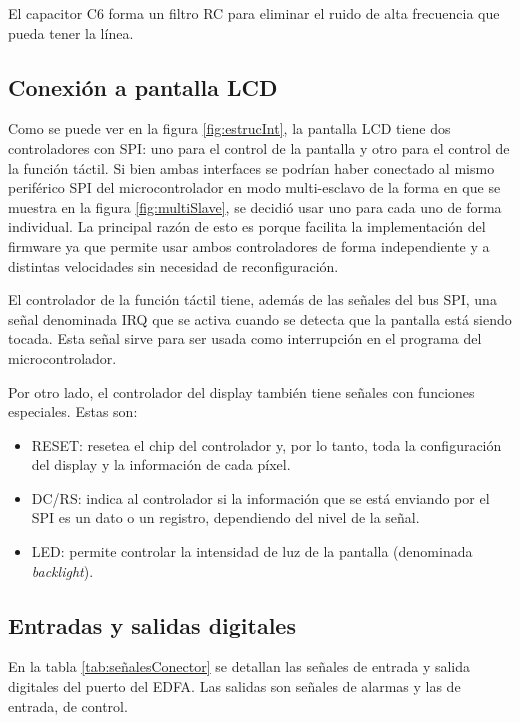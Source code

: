 El capacitor C6 forma un filtro RC \citep{WEBSITE:RC_CIRCUIT} para eliminar el ruido de alta frecuencia que pueda tener la línea.

\subsection{Conexión a pantalla LCD}
\label{sec:conLCD}

Como se puede ver en la figura \ref{fig:estrucInt}, la pantalla LCD tiene dos controladores con SPI: uno para el control de la pantalla y otro para el control de la función táctil. Si bien ambas interfaces se podrían haber conectado al mismo periférico SPI del microcontrolador en modo multi-esclavo de la forma en que se muestra en la figura \ref{fig:multiSlave}, se decidió usar uno para cada uno de forma individual. La principal razón de esto es porque facilita la implementación del firmware ya que permite usar ambos controladores de forma independiente y a distintas velocidades sin necesidad de reconfiguración.

El controlador de la función táctil tiene, además de las señales del bus SPI, una señal denominada IRQ que se activa cuando se detecta que la pantalla está siendo tocada. Esta señal sirve para ser usada como interrupción en el programa del microcontrolador.

Por otro lado, el controlador del display también tiene señales con funciones especiales. Estas son:

\begin{itemize}
\item RESET: resetea el chip del controlador y, por lo tanto, toda la configuración del display y la información de cada píxel.
\item DC/RS: indica al controlador si la información que se está enviando por el SPI es un dato o un registro, dependiendo del nivel de la señal.
\item LED: permite controlar la intensidad de luz de la pantalla (denominada \textit{backlight}).
\end{itemize}

\subsection{Entradas y salidas digitales}

En la tabla \ref{tab:señalesConector} se detallan las señales de entrada y salida digitales del puerto del EDFA. Las salidas son señales de alarmas y las de entrada, de control.

